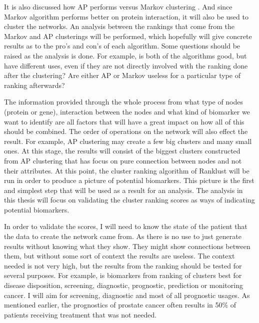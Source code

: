 It is also discussed how AP performs versus Markov clustering \cite{ap-vs-mcl}.
And since Markov algorithm performs better on protein interaction, it will also
be used to cluster the networks. An analysis between the rankings that come from
the Markov and AP clusterings will be performed, which hopefully will give
concrete results as to the pro's and con's of each algorithm. Some questions
should be raised as the analysis is done. For example, is both of the algorithms
good, but have different uses, even if they are not directly involved with the
ranking done after the clustering?  Are either AP or Markov useless for
a particular type of ranking afterwards?

The information provided through the whole process from what type of nodes
(protein or gene), interaction between the nodes and what kind of biomarker we
want to identify are all factors that will have a great impact on how all of
this should be combined. The order of operations on the network will also effect
the result. For example, AP clustering may create a few big clusters and many
small ones. At this stage, the results will consist of the biggest clusters
constructed from AP clustering that has focus on pure connection between nodes
and not their attributes. At this point, the cluster ranking algorithm of
Ranklust will be run in order to produce a picture of potential biomarkers. This
picture is the first and simplest step that will be used as a result for an
analysis. The analysis in this thesis will focus on validating the cluster
ranking scores as ways of indicating potential biomarkers. 

In order to validate the scores, I will need to know the state of the patient
that the data to create the network came from. As there is no use to just
generate results without knowing what they show. They might show connections
between them, but without some sort of context the results are useless. The
context needed is not very high, but the results from the ranking should be
tested for several purposes. For example, is biomarkers from ranking of clusters
best for disease disposition, screening, diagnostic, prognostic, prediction or
monitoring cancer. I will aim for screening, diagnostic and most of all
prognostic usages. As mentioned earlier, the prognostics of prostate cancer
often results in 50\% of patients receiving treatment that was not needed.

